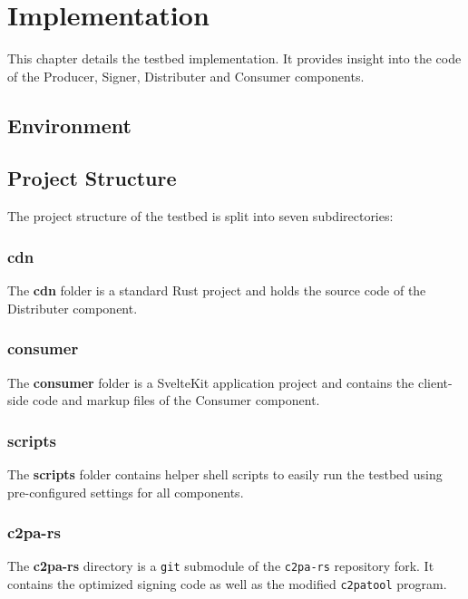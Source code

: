 \chapter{Implementation\label{cha:chapter5}}

This chapter details the testbed implementation. It provides insight into the code of the Producer, Signer, Distributer and Consumer components. 

\section{Environment\label{sec:env}}


\section{Project Structure\label{sec:projectstructure}}

The project structure of the testbed is split into seven subdirectories:

\subsection{cdn}

The \textbf{cdn} folder is a standard Rust project and holds the source code of the Distributer component.

\subsection{consumer}

The \textbf{consumer} folder is a SvelteKit application project and contains the client-side code and markup files of the Consumer component.

\subsection{scripts}

The \textbf{scripts} folder contains helper shell scripts to easily run the testbed using pre-configured settings for all components.

\subsection{c2pa-rs}

The \textbf{c2pa-rs} directory is a \texttt{git} submodule of the \texttt{c2pa-rs} repository fork. It contains the optimized signing code as well as the modified \texttt{c2patool} program.


